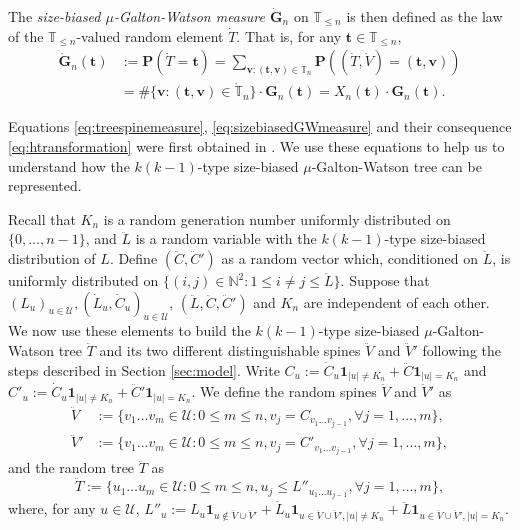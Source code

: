 \documentclass[12pt,a4paper]{amsart}
\numberwithin{equation}{section}
\begin{document}
	The \emph{size-biased $\mu$-Galton-Watson measure $\dot {\mathbf G}_n$} on $\mathbb T_{\leq n}$ is then defined as the law of the $\mathbb T_{\leq n}$-valued random element $\dot T$. That is, for any $ \mathbf t \in\mathbb T_{\leq n}$,
\begin{equation}
\label{eq:sizebiasedGWmeasure}
\begin{split}
		\dot {\mathbf G}_n( \mathbf t )
	&:= \mathbf P(\dot T= \mathbf t )
	= \sum_{ \mathbf v:( \mathbf t , \mathbf v)\in \dot{\mathbb T}_n} \mathbf P((\dot T,\dot V)=( \mathbf t , \mathbf v))
	\\&= \#\{ \mathbf v:( \mathbf t , \mathbf v)\in \dot{\mathbb T}_n\} \cdot \mathbf G_n( \mathbf t )
	= X_n( \mathbf t ) \cdot \mathbf G_n( \mathbf t ).
\end{split}
\end{equation}

	Equations \eqref{eq:treespinemeasure}, \eqref{eq:sizebiasedGWmeasure} and their consequence \eqref{eq:htransformation} were first obtained in \cite{lyons1995conceptual}.
	We use these equations to help us to understand how the $k(k-1)$-type size-biased $\mu$-Galton-Watson tree can be represented.
	
	Recall that $K_n$ is a random generation number uniformly distributed on $\{0,\dots,n-1\}$, and $\ddot L$ is a random variable with the $k(k-1)$-type size-biased distribution of $L$.
	Define $(\ddot C,\ddot C')$ as a random vector which, conditioned on $\ddot L$, is uniformly distributed on $\{(i,j)\in\mathbb N^2:1\leq i\neq j\leq \ddot L\}$.
	Suppose that $(L_u)_{u\in\mathcal U}, (\dot L_u,\dot C_u)_{u\in \mathcal U}$, $(\ddot L,\ddot C,\ddot C')$ and $K_n$ are independent of each other.
	We now use these elements to build the $k(k-1)$-type size-biased $\mu$-Galton-Watson tree $\ddot T$ and its two different distinguishable spines $\ddot V$ and $\ddot V'$ following the steps described in Section \ref{sec:model}.
	Write $C_u:=\dot C_u\mathbf 1_{|u|\neq K_n}+\ddot C\mathbf 1_{|u|=K_n}$ and $C'_u:=\dot C_u\mathbf 1_{|u|\neq K_n}+\ddot C'\mathbf 1_{|u|=K_n}$.
	We define the random spines $\ddot V$ and $\ddot V'$ as
\begin{align*}
        \ddot V
	&:= \{v_1\dots v_m\in \mathcal U:0\le m\le n, v_j= C_{v_1\dots v_{j-1}},\forall j=1,\dots,m\},
	\\ \ddot V'
	&:= \{v_1\dots v_m\in \mathcal U:0\le m \le n, v_j= C'_{v_1\dots v_{j-1}},\forall j=1,\dots,m\},
\end{align*}
	and the random tree $\ddot T$ as
\begin{equation*}
	    \ddot T
	:=
		\{u_1\dots u_m\in\mathcal U: 0\le m\le n,u_j\leq L''_{u_1\dots u_{j-1}},\forall j=1,\dots,m\},
\end{equation*}
	where, for any $u\in\mathcal U$, $L''_u:=L_u \mathbf 1_{u\not\in \ddot V\cup\ddot V'}+\dot L_u \mathbf 1_{u\in \ddot V\cup\ddot V',|u|\neq K_n}+\ddot L\mathbf 1_{u\in \ddot V\cup\ddot V',|u|=K_n}$.
\end{document}
